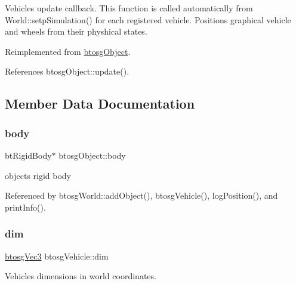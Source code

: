 Vehicle\textquotesingle{}s update callback. This function is called automatically from World\+::setp\+Simulation() for each registered vehicle. Positions graphical vehicle and wheels from their physhical states. 

Reimplemented from \hyperlink{classbtosgObject_a342917817dfde62554f83da8e0d5110b}{btosg\+Object}.



References btosg\+Object\+::update().



\subsection{Member Data Documentation}
\mbox{\label{classbtosgObject_a64ccde0543c184ed1749fdb9c9699785}} 
\subsubsection{\texorpdfstring{body}{body}}
{\footnotesize\ttfamily bt\+Rigid\+Body$\ast$ btosg\+Object\+::body\hspace{0.3cm}{\ttfamily [inherited]}}



object\textquotesingle{}s rigid body 



Referenced by btosg\+World\+::add\+Object(), btosg\+Vehicle(), log\+Position(), and print\+Info().

\mbox{\label{classbtosgVehicle_a2173f99ca0719929aa5a1c890927aca3}} 
\subsubsection{\texorpdfstring{dim}{dim}}
{\footnotesize\ttfamily \hyperlink{classbtosgVec3}{btosg\+Vec3} btosg\+Vehicle\+::dim}



Vehicle\textquotesingle{}s dimensions in world coordinates. 

\mbox{\label{classbtosgVehicle_aed23010bba3c34158abd4548328b3819}} 
